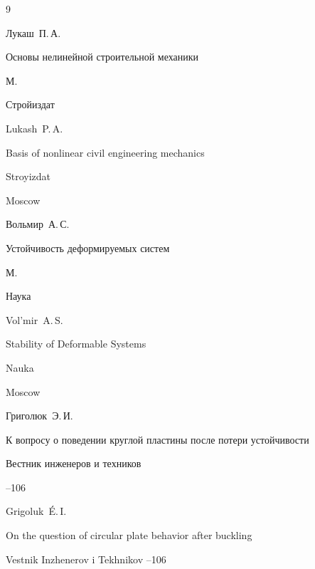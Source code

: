 \begin{thebibliography}{9}

\by Лукаш~П.\,А.

\book Основы нелинейной строительной механики

\publaddr М.

\publ Стройиздат



\misctransl

\by Lukash~P.\,A.

\book Basis of nonlinear civil engineering mechanics

\publ Stroyizdat

\publaddr Moscow 






\by Вольмир~А.\,С.

\book Устойчивость деформируемых систем

\publaddr М.

\publ Наука



\misctransl

\by Vol'mir~A.\,S.

\book Stability of Deformable Systems 

\publ Nauka

\publaddr Moscow 






\by Григолюк~Э.\,И.

\paper К вопросу о поведении круглой пластины после потери устойчивости

\jour Вестник инженеров и техников



--106

\misctransl

\by Grigoluk~\'E.\,I.

\paper On the question of circular plate behavior   after buckling

\jour Vestnik Inzhenerov i Tekhnikov   --106





\end{thebibliography}







